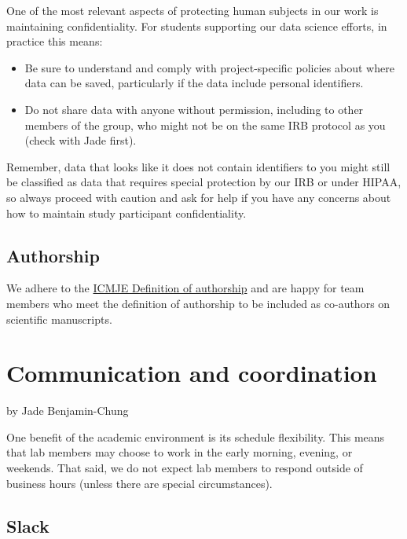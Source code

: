 \documentclass[
]{book}
\providecommand{\tightlist}{%
  \setlength{\itemsep}{0pt}\setlength{\parskip}{0pt}}
\begin{document}
One of the most relevant aspects of protecting human subjects in our work is maintaining confidentiality. For students supporting our data science efforts, in practice this means:

\begin{itemize}
\tightlist
\item
  Be sure to understand and comply with project-specific policies about where data can be saved, particularly if the data include personal identifiers.
\item
  Do not share data with anyone without permission, including to other members of the group, who might not be on the same IRB protocol as you (check with Jade first).
\end{itemize}

Remember, data that looks like it does not contain identifiers to you might still be classified as data that requires special protection by our IRB or under HIPAA, so always proceed with caution and ask for help if you have any concerns about how to maintain study participant confidentiality.

\section{Authorship}\label{authorship}

We adhere to the \href{http://www.icmje.org/recommendations/browse/roles-and-responsibilities/defining-the-role-of-authors-and-contributors.html}{ICMJE Definition of authorship} and are happy for team members who meet the definition of authorship to be included as co-authors on scientific manuscripts.

\chapter{Communication and coordination}\label{communication-and-coordination}

by Jade Benjamin-Chung

One benefit of the academic environment is its schedule flexibility. This means that lab members may choose to work in the early morning, evening, or weekends. That said, we do not expect lab members to respond outside of business hours (unless there are special circumstances).

\section{Slack}\label{slack}
\end{document}
